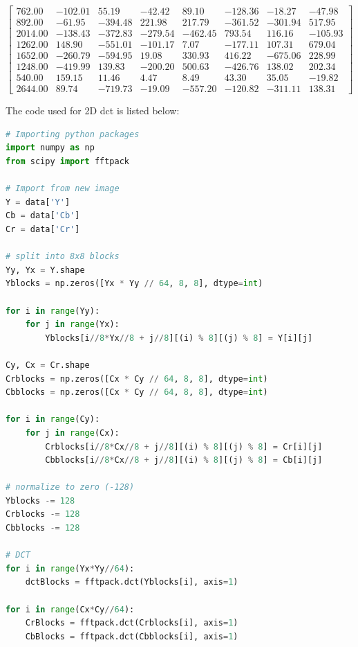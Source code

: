 \documentclass{article}
\begin{document}
\begin{equation*}
\begin{bmatrix}
	762.00  & -102.01 & 55.19   & -42.42  & 89.10   & -128.36 & -18.27  & -47.98 \\
	892.00  & -61.95  & -394.48 & 221.98  & 217.79  & -361.52 & -301.94 & 517.95 \\
	2014.00 & -138.43 & -372.83 & -279.54 & -462.45 & 793.54  & 116.16  & -105.93 \\
	1262.00 & 148.90  & -551.01 & -101.17 & 7.07    & -177.11 & 107.31  & 679.04 \\
	1652.00 & -260.79 & -594.95 & 19.08   & 330.93  & 416.22  & -675.06 & 228.99 \\
	1248.00 & -419.99 & 139.83  & -200.20 & 500.63  & -426.76 & 138.02  & 202.34 \\
	540.00  & 159.15  & 11.46   & 4.47    & 8.49    & 43.30   & 35.05   & -19.82 \\
	2644.00 & 89.74   & -719.73 & -19.09  & -557.20 & -120.82 & -311.11 & 138.31
\end{bmatrix}
\end{equation*}

The code used for 2D dct is listed below:
\begin{lstlisting}[language=Python]
# Importing python packages
import numpy as np
from scipy import fftpack

# Import from new image
Y = data['Y']
Cb = data['Cb']
Cr = data['Cr']

# split into 8x8 blocks
Yy, Yx = Y.shape
Yblocks = np.zeros([Yx * Yy // 64, 8, 8], dtype=int)

for i in range(Yy):
    for j in range(Yx):
        Yblocks[i//8*Yx//8 + j//8][(i) % 8][(j) % 8] = Y[i][j]

Cy, Cx = Cr.shape
Crblocks = np.zeros([Cx * Cy // 64, 8, 8], dtype=int)
Cbblocks = np.zeros([Cx * Cy // 64, 8, 8], dtype=int)

for i in range(Cy):
    for j in range(Cx):
        Crblocks[i//8*Cx//8 + j//8][(i) % 8][(j) % 8] = Cr[i][j]
        Cbblocks[i//8*Cx//8 + j//8][(i) % 8][(j) % 8] = Cb[i][j]

# normalize to zero (-128)
Yblocks -= 128
Crblocks -= 128
Cbblocks -= 128

# DCT
for i in range(Yx*Yy//64):
    dctBlocks = fftpack.dct(Yblocks[i], axis=1)

for i in range(Cx*Cy//64):
    CrBlocks = fftpack.dct(Crblocks[i], axis=1)
    CbBlocks = fftpack.dct(Cbblocks[i], axis=1)
\end{lstlisting}
\end{document}

